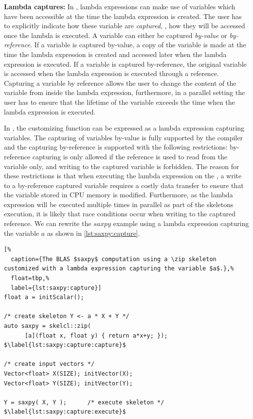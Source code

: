 \textbf{Lambda captures:}
In \Cpp, lambda expressions can make use of variables which have been accessible at the time the lambda expression is created.
The user has to explicitly indicate how these variable are \emph{captured}, \ie, how they will be accessed once the lambda is executed.
A variable can either be captured \emph{by-value} or \emph{by-reference}.
If a variable is captured by-value, a copy of the variable is made at the time the lambda expression is created and accessed later when the lambda expression is executed.
If a variable is captured by-reference, the original variable is accessed when the lambda expression is executed through a reference.
Capturing a variable by reference allows the user to change the content of the variable from inside the lambda expression, furthermore, in a parallel setting the user has to ensure that the lifetime of the variable exceeds the time when the lambda expression is executed.

In \SkelCL, the customizing function can be expressed as a lambda expression capturing variables.
The capturing of variables by-value is fully supported by the  compiler and the capturing by-reference is supported with the following restrictions:
by-reference capturing is only allowed if the reference is used to read from the variable only, and writing to the captured variable is forbidden.
The reason for these restrictions is that when executing the lambda expression on the \GPU, a write to a by-reference captured variable requires a costly data transfer to ensure that the variable stored in CPU memory is modified.
Furthermore, as the lambda expression will be executed multiple times in parallel as part of the skeletons execution, it is likely that race conditions occur when writing to the captured reference.
We can rewrite the $saxpy$ example using a lambda expression capturing the variable $a$ as shown in \autoref{lst:saxpy:capture}.
\begin{lstlisting}[%
  caption={The BLAS $saxpy$ computation using a \zip skeleton customized with a lambda expression capturing the variable $a$.},%
  float=tbp,%
  label={lst:saxpy:capture}]
float a = initScalar();

/* create skeleton Y <- a * X + Y */
auto saxpy = skelcl::zip(
      [a](float x, float y) { return a*x+y; }); $\label{lst:saxpy:capture:capture}$

/* create input vectors */
Vector<float> X(SIZE); initVector(X);
Vector<float> Y(SIZE); initVector(Y);

Y = saxpy( X, Y );      /* execute skeleton */ $\label{lst:saxpy:capture:execute}$
\end{lstlisting}

